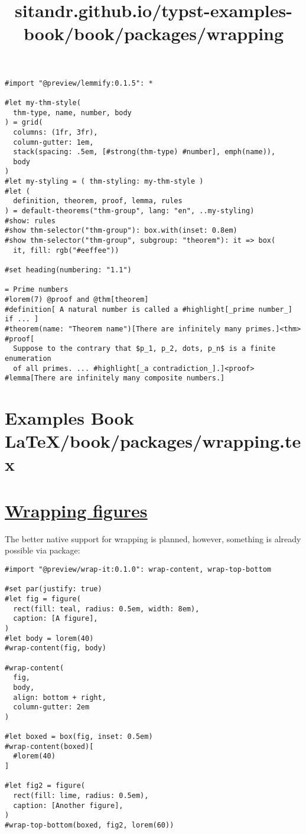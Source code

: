 \begin{verbatim}
#import "@preview/lemmify:0.1.5": *

#let my-thm-style(
  thm-type, name, number, body
) = grid(
  columns: (1fr, 3fr),
  column-gutter: 1em,
  stack(spacing: .5em, [#strong(thm-type) #number], emph(name)),
  body
)
#let my-styling = ( thm-styling: my-thm-style )
#let (
  definition, theorem, proof, lemma, rules
) = default-theorems("thm-group", lang: "en", ..my-styling)
#show: rules
#show thm-selector("thm-group"): box.with(inset: 0.8em)
#show thm-selector("thm-group", subgroup: "theorem"): it => box(
  it, fill: rgb("#eeffee"))

#set heading(numbering: "1.1")

= Prime numbers
#lorem(7) @proof and @thm[theorem]
#definition[ A natural number is called a #highlight[_prime number_] if ... ]
#theorem(name: "Theorem name")[There are infinitely many primes.]<thm>
#proof[
  Suppose to the contrary that $p_1, p_2, dots, p_n$ is a finite enumeration
  of all primes. ... #highlight[_a contradiction_].]<proof>
#lemma[There are infinitely many composite numbers.]
\end{verbatim}

\pandocbounded{}


\section{Examples Book LaTeX/book/packages/wrapping.tex}
\title{sitandr.github.io/typst-examples-book/book/packages/wrapping}

\section{\texorpdfstring{\hyperref[wrapping-figures]{Wrapping
figures}}{Wrapping figures}}\label{wrapping-figures}

The better native support for wrapping is planned, however, something is
already possible via package:

\begin{verbatim}
#import "@preview/wrap-it:0.1.0": wrap-content, wrap-top-bottom

#set par(justify: true)
#let fig = figure(
  rect(fill: teal, radius: 0.5em, width: 8em),
  caption: [A figure],
)
#let body = lorem(40)
#wrap-content(fig, body)

#wrap-content(
  fig,
  body,
  align: bottom + right,
  column-gutter: 2em
)

#let boxed = box(fig, inset: 0.5em)
#wrap-content(boxed)[
  #lorem(40)
]

#let fig2 = figure(
  rect(fill: lime, radius: 0.5em),
  caption: [Another figure],
)
#wrap-top-bottom(boxed, fig2, lorem(60))
\end{verbatim}

